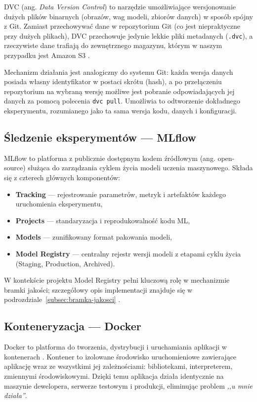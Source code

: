 DVC (ang. \textit{Data Version Control}) to narzędzie umożliwiające wersjonowanie dużych plików binarnych (obrazów, wag modeli, zbiorów danych) w sposób spójny z Git. Zamiast przechowywać dane w repozytorium Git (co jest niepraktyczne przy dużych plikach), DVC przechowuje jedynie lekkie pliki metadanych (\texttt{.dvc}), a rzeczywiste dane trafiają do zewnętrznego magazynu, którym w naszym przypadku jest Amazon S3 \cite{dvc_docs}.

Mechanizm działania jest analogiczny do systemu Git: każda wersja danych posiada własny identyfikator w postaci skrótu (hash), a po przełączeniu repozytorium na wybraną wersję możliwe jest pobranie odpowiadających jej danych za pomocą polecenia \texttt{dvc pull}. Umożliwia to odtworzenie dokładnego eksperymentu, rozumianego jako ta sama wersja kodu, danych i konfiguracji.

\subsection{Śledzenie eksperymentów --- MLflow}
\label{subsec:mlflow}

MLflow to platforma z publicznie dostępnym kodem źródłowym (ang. open-source) służąca do zarządzania cyklem życia modeli uczenia maszynowego. Składa się z czterech głównych komponentów:

\begin{itemize}
  \item \textbf{Tracking} --- rejestrowanie parametrów, metryk i artefaktów każdego uruchomienia eksperymentu,
  \item \textbf{Projects} --- standaryzacja i reprodukowalność kodu ML,
  \item \textbf{Models} --- zunifikowany format pakowania modeli,
  \item \textbf{Model Registry} --- centralny rejestr wersji modeli z etapami cyklu życia (Staging, Production, Archived).
\end{itemize}

W kontekście projektu Model Registry pełni kluczową rolę w mechanizmie bramki jakości; szczegółowy opis implementacji znajduje się w podrozdziale~\ref{subsec:bramka-jakosci} \cite{mlflow_model_registry}.

\subsection{Konteneryzacja --- Docker}

Docker to platforma do tworzenia, dystrybucji i uruchamiania aplikacji w kontenerach \cite{merkel2014docker}. Kontener to izolowane środowisko uruchomieniowe zawierające aplikację wraz ze wszystkimi jej zależnościami: bibliotekami, interpreterem, zmiennymi środowiskowymi. Dzięki temu aplikacja działa identycznie na maszynie dewelopera, serwerze testowym i produkcji, eliminując problem \textit{,,u mnie działa''}.

